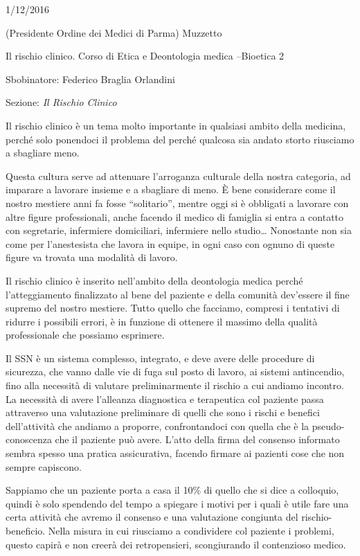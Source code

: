 \documentclass[]{article}
\date{}
\begin{document}
1/12/2016

(Presidente Ordine dei Medici di Parma) Muzzetto

Il rischio clinico. Corso di Etica e Deontologia medica --Bioetica 2

Sbobinatore: Federico Braglia Orlandini

Sezione: \emph{Il Rischio Clinico}

Il rischio clinico è un tema molto importante in qualsiasi ambito della
medicina, perché solo ponendoci il problema del perché qualcosa sia
andato storto riusciamo a sbagliare meno.

Questa cultura serve ad attenuare l'arroganza culturale della nostra
categoria, ad imparare a lavorare insieme e a sbagliare di meno. È bene
considerare come il nostro mestiere anni fa fosse ``solitario'', mentre
oggi si è obbligati a lavorare con altre figure professionali, anche
facendo il medico di famiglia si entra a contatto con segretarie,
infermiere domiciliari, infermiere nello studio\ldots{} Nonostante non
sia come per l'anestesista che lavora in equipe, in ogni caso con ognuno
di queste figure va trovata una modalità di lavoro.

Il rischio clinico è inserito nell'ambito della deontologia medica
perché l'atteggiamento finalizzato al bene del paziente e della comunità
dev'essere il fine supremo del nostro mestiere. Tutto quello che
facciamo, compresi i tentativi di ridurre i possibili errori, è in
funzione di ottenere il massimo della qualità professionale che possiamo
esprimere.

Il SSN è un sistema complesso, integrato, e deve avere delle procedure
di sicurezza, che vanno dalle vie di fuga sul posto di lavoro, ai
sistemi antincendio, fino alla necessità di valutare preliminarmente il
rischio a cui andiamo incontro. La necessità di avere l'alleanza
diagnostica e terapeutica col paziente passa attraverso una valutazione
preliminare di quelli che sono i rischi e benefici dell'attività che
andiamo a proporre, confrontandoci con quella che è la pseudo-conoscenza
che il paziente può avere. L'atto della firma del consenso informato
sembra spesso una pratica assicurativa, facendo firmare ai pazienti cose
che non sempre capiscono.

Sappiamo che un paziente porta a casa il 10\% di quello che si dice a
colloquio, quindi è solo spendendo del tempo a spiegare i motivi per i
quali è utile fare una certa attività che avremo il consenso e una
valutazione congiunta del rischio-beneficio. Nella misura in cui
riusciamo a condividere col paziente i problemi, questo capirà e non
creerà dei retropensieri, scongiurando il contenzioso medico.
\end{document}
